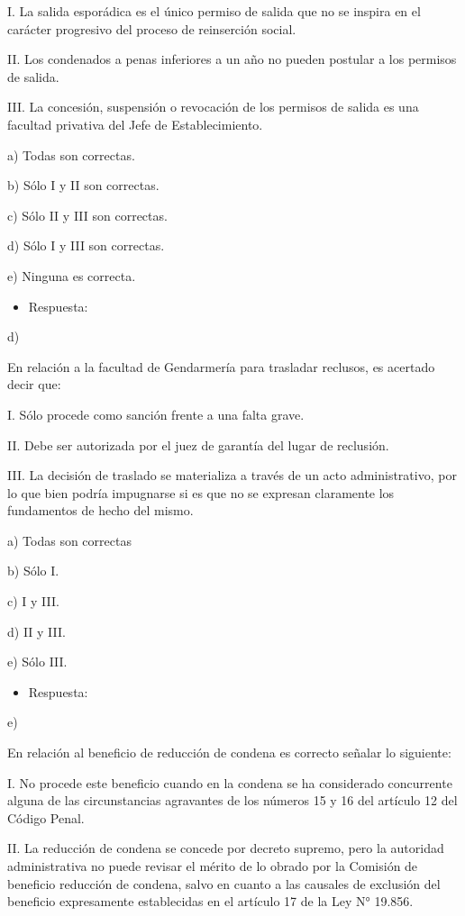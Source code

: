 \documentclass[letterpaper, 11pt]{article}
\begin{document}
I. La salida esporádica es el único permiso de salida que no se inspira en el carácter
progresivo del proceso de reinserción social.

II. Los condenados a penas inferiores a un año no pueden postular a los permisos de
salida.

III. La concesión, suspensión o revocación de los permisos de salida es una facultad
privativa del Jefe de Establecimiento.

a) Todas son correctas.

b) Sólo I y II son correctas.

c) Sólo II y III son correctas.

d) Sólo I y III son correctas.

e) Ninguna es correcta.

\begin{itemize}
\item Respuesta:
\end{itemize}
d)


En relación a la facultad de Gendarmería para trasladar reclusos, es acertado decir
que:

I. Sólo procede como sanción frente a una falta grave.

II. Debe ser autorizada por el juez de garantía del lugar de reclusión.

III. La decisión de traslado se materializa a través de un acto administrativo, por lo que
bien podría impugnarse si es que no se expresan claramente los fundamentos de
hecho del mismo.

a) Todas son correctas

b) Sólo I.

c) I y III.

d) II y III.

e) Sólo III.

\begin{itemize}
\item Respuesta:
\end{itemize}
e)

En relación al beneficio de reducción de condena es correcto señalar lo siguiente:

I. No procede este beneficio cuando en la condena se ha considerado concurrente
alguna de las circunstancias agravantes de los números 15 y 16 del artículo 12 del
Código Penal.

II. La reducción de condena se concede por decreto supremo, pero la autoridad
administrativa no puede revisar el mérito de lo obrado por la Comisión de
beneficio reducción de condena, salvo en cuanto a las causales de exclusión del
beneficio expresamente establecidas en el artículo 17 de la Ley N° 19.856.
\end{document}
